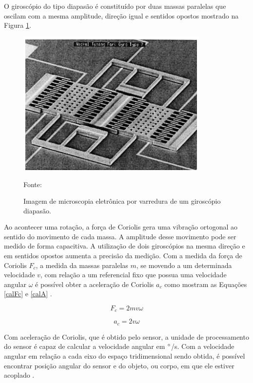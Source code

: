 			O giroscópio do tipo diapasão é constituído por duas massas paralelas que oscilam com a mesma amplitude, direção igual e sentidos opostos mostrado na Figura \ref{gyro}.
			
			\begin{figure}[h]
				\centering
				\includegraphics[keepaspectratio=true,scale=0.7
				]{figuras/diapasao.png}
				\caption{ Imagem de microscopia eletrônica por varredura de um giroscópio diapasão.}
				Fonte: \cite{forhan2010}
				\label{gyro}	
			\end{figure}
			
			Ao acontecer uma rotação, a força de Coriolis gera uma vibração ortogonal ao sentido do movimento de cada massa. A amplitude desse movimento pode ser medido de forma capacitiva. A utilização de dois giroscópios na mesma direção e em sentidos opostos aumenta a precisão da medição. Com a medida da força de Coriolis  $F_{c}$, a medida da massas paralelas $m$, se movendo a um determinada velocidade $v$, com relação a um referencial fixo que possua uma velocidade angular $ \omega $ é possível obter a aceleração de Coriolis $a_{c}$ como mostram as Equações \ref{calFc} e \ref{calA} \cite{forhan2010}.
			
			\begin{equation}
			F_{c} = 2mv\omega
			\label{calFc}
			\end{equation}
			
			\begin{equation}
			a_{c} = 2v\omega
			\label{calA}
			\end{equation}
			
			Com aceleração de Coriolis, que é obtido pelo sensor, a unidade de processamento do sensor é capaz de calcular a velocidade angular em $\degree$/s. Com a velocidade angular em relação a cada eixo do espaço tridimensional sendo obtida, é possível encontrar posição angular do sensor e do objeto, ou corpo, em que ele estiver acoplado \cite{forhan2010}\cite{moyses2013}. 
			
